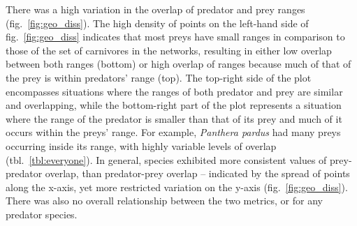 \documentclass[10pt,oneside]{article}
\begin{document}
There was a high variation in the overlap of predator and prey ranges
(fig.~\ref{fig:geo_diss}). The high density of points on the left-hand
side of fig.~\ref{fig:geo_diss} indicates that most preys have small
ranges in comparison to those of the set of carnivores in the networks,
resulting in either low overlap between both ranges (bottom) or high
overlap of ranges because much of that of the prey is within predators'
range (top). The top-right side of the plot encompasses situations where
the ranges of both predator and prey are similar and overlapping, while
the bottom-right part of the plot represents a situation where the range
of the predator is smaller than that of its prey and much of it occurs
within the preys' range. For example, \emph{Panthera pardus} had many
preys occurring inside its range, with highly variable levels of overlap
(tbl.~\ref{tbl:everyone}). In general, species exhibited more consistent
values of prey-predator overlap, than predator-prey overlap -- indicated
by the spread of points along the x-axis, yet more restricted variation
on the y-axis (fig.~\ref{fig:geo_diss}). There was also no overall
relationship between the two metrics, or for any predator species.
\end{document}
